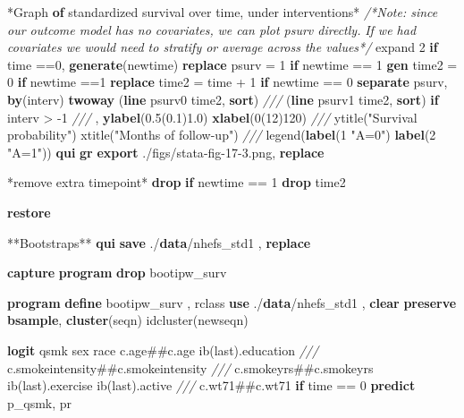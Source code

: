 \documentclass[
  10pt,
]{book}
\newenvironment{Shaded}{\begin{snugshade}}{\end{snugshade}}
\newcommand{\BaseNTok}[1]{\textcolor[rgb]{0.00,0.00,0.81}{#1}}
\newcommand{\CommentTok}[1]{\textcolor[rgb]{0.56,0.35,0.01}{\textit{#1}}}
\newcommand{\FunctionTok}[1]{\textcolor[rgb]{0.00,0.00,0.00}{#1}}
\newcommand{\KeywordTok}[1]{\textcolor[rgb]{0.13,0.29,0.53}{\textbf{#1}}}
\newcommand{\NormalTok}[1]{#1}
\newcommand{\StringTok}[1]{\textcolor[rgb]{0.31,0.60,0.02}{#1}}
\begin{document}
\begin{Shaded}
\begin{Highlighting}[]
\NormalTok{*Graph }\KeywordTok{of}\NormalTok{ standardized survival }\BaseNTok{over}\NormalTok{ time, under interventions*}
\CommentTok{/*Note: since our outcome model has no covariates, }
\CommentTok{we can plot psurv directly. }
\CommentTok{If we had covariates we would need to stratify or average across the values*/}
\NormalTok{expand 2 }\KeywordTok{if}\NormalTok{ time ==0, }\KeywordTok{generate}\NormalTok{(newtime)}
\KeywordTok{replace}\NormalTok{ psurv  = 1 }\KeywordTok{if}\NormalTok{ newtime == 1}
\KeywordTok{gen}\NormalTok{ time2 = 0 }\KeywordTok{if}\NormalTok{ newtime ==1}
\KeywordTok{replace}\NormalTok{ time2 = time + 1 }\KeywordTok{if}\NormalTok{ newtime == 0}
\KeywordTok{separate}\NormalTok{ psurv, }\KeywordTok{by}\NormalTok{(interv) }
\KeywordTok{twoway}\NormalTok{ (}\KeywordTok{line}\NormalTok{ psurv0 time2, }\KeywordTok{sort}\NormalTok{) }\CommentTok{///}
\NormalTok{  (}\KeywordTok{line}\NormalTok{ psurv1 time2, }\KeywordTok{sort}\NormalTok{) }\KeywordTok{if}\NormalTok{ interv \textgreater{} {-}1 }\CommentTok{///}
\NormalTok{  , }\KeywordTok{ylabel}\NormalTok{(0.5(0.1)1.0) }\KeywordTok{xlabel}\NormalTok{(0(12)120) }\CommentTok{///}
  \BaseNTok{ytitle}\NormalTok{(}\StringTok{"Survival probability"}\NormalTok{) }\BaseNTok{xtitle}\NormalTok{(}\StringTok{"Months of follow{-}up"}\NormalTok{) }\CommentTok{///}
  \BaseNTok{legend}\NormalTok{(}\KeywordTok{label}\NormalTok{(1 }\StringTok{"A=0"}\NormalTok{) }\KeywordTok{label}\NormalTok{(2 }\StringTok{"A=1"}\NormalTok{))}
\KeywordTok{qui} \KeywordTok{gr} \KeywordTok{export}\NormalTok{ ./figs/stata{-}fig{-}17{-}3.png, }\KeywordTok{replace}

\NormalTok{*remove extra timepoint*}
\KeywordTok{drop} \KeywordTok{if}\NormalTok{ newtime == 1}
\KeywordTok{drop}\NormalTok{ time2}

\KeywordTok{restore}

\NormalTok{**Bootstraps**}
\KeywordTok{qui} \KeywordTok{save}\NormalTok{ ./}\KeywordTok{data}\NormalTok{/nhefs\_std1 , }\KeywordTok{replace}
 
\KeywordTok{capture} \KeywordTok{program} \KeywordTok{drop}\NormalTok{ bootipw\_surv }

\KeywordTok{program} \KeywordTok{define}\NormalTok{ bootipw\_surv , rclass}
\KeywordTok{use}\NormalTok{ ./}\KeywordTok{data}\NormalTok{/nhefs\_std1 , }\KeywordTok{clear}
\KeywordTok{preserve}
\KeywordTok{bsample}\NormalTok{, }\KeywordTok{cluster}\NormalTok{(seqn) idcluster(newseqn)   }
        
\KeywordTok{logit}\NormalTok{ qsmk sex race c.age\#\#c.age ib(}\FunctionTok{last}\NormalTok{).education }\CommentTok{///}
\NormalTok{  c.smokeintensity\#\#c.smokeintensity }\CommentTok{///}
\NormalTok{    c.smokeyrs\#\#c.smokeyrs ib(}\FunctionTok{last}\NormalTok{).exercise ib(}\FunctionTok{last}\NormalTok{).active }\CommentTok{///}
\NormalTok{    c.wt71\#\#c.wt71 }\KeywordTok{if}\NormalTok{ time == 0}
\KeywordTok{predict}\NormalTok{ p\_qsmk, pr}


\end{Highlighting}
\end{Shaded}
\end{document}
